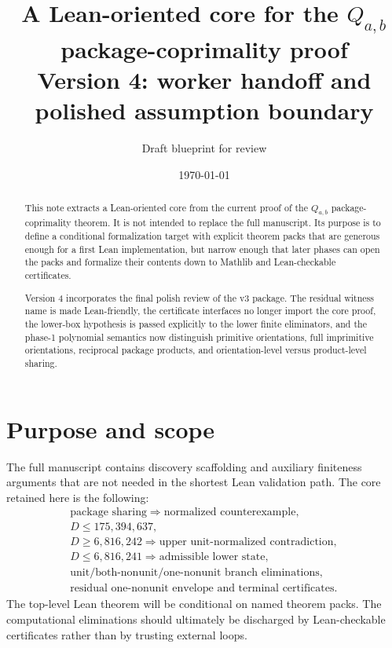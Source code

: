 \documentclass[11pt]{article}
\title{A Lean-oriented core for the $Q_{a,b}$ package-coprimality proof\\
       Version 4: worker handoff and polished assumption boundary}
\author{Draft blueprint for review}
\date{\today}
\begin{document}
\maketitle

\begin{abstract}
This note extracts a Lean-oriented core from the current proof of the
$Q_{a,b}$ package-coprimality theorem.  It is not intended to replace the full
manuscript.  Its purpose is to define a conditional formalization target with
explicit theorem packs that are generous enough for a first Lean
implementation, but narrow enough that later phases can open the packs and
formalize their contents down to Mathlib and Lean-checkable certificates.

Version 4 incorporates the final polish review of the v3 package.  The residual
witness name is made Lean-friendly, the certificate interfaces no longer import
the core proof, the lower-box hypothesis is passed explicitly to the lower
finite eliminators, and the phase-1 polynomial semantics now distinguish
primitive orientations, full imprimitive orientations, reciprocal package
products, and orientation-level versus product-level sharing.
\end{abstract}

\section{Purpose and scope}

The full manuscript contains discovery scaffolding and auxiliary finiteness
arguments that are not needed in the shortest Lean validation path.  The core
retained here is the following:
\[
\begin{gathered}
\text{package sharing}
\Rightarrow \text{normalized counterexample},\\
D\leq 175{,}394{,}637,\\
D\geq 6{,}816{,}242 \Rightarrow \text{upper unit-normalized contradiction},\\
D\leq 6{,}816{,}241 \Rightarrow \text{admissible lower state},\\
\text{unit/both-nonunit/one-nonunit branch eliminations},\\
\text{residual one-nonunit envelope and terminal certificates}.
\end{gathered}
\]
The top-level Lean theorem will be conditional on named theorem packs.  The
computational eliminations should ultimately be discharged by Lean-checkable
certificates rather than by trusting external loops.
\end{document}
